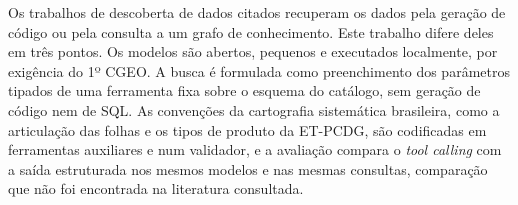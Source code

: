 Os trabalhos de descoberta de dados citados recuperam os dados pela geração de código ou pela consulta a um grafo de conhecimento. Este trabalho difere deles em três pontos. Os modelos são abertos, pequenos e executados localmente, por exigência do 1º CGEO. A busca é formulada como preenchimento dos parâmetros tipados de uma ferramenta fixa sobre o esquema do catálogo, sem geração de código nem de SQL. As convenções da cartografia sistemática brasileira, como a articulação das folhas e os tipos de produto da ET-PCDG, são codificadas em ferramentas auxiliares e num validador, e a avaliação compara o \textit{tool calling} com a saída estruturada nos mesmos modelos e nas mesmas consultas, comparação que não foi encontrada na literatura consultada.
